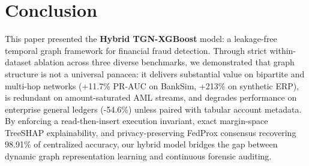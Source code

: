 \section{Conclusion}\label{sec:conclusion}
This paper presented the \textbf{Hybrid TGN-XGBoost} model: a leakage-free temporal graph framework for financial fraud detection. Through strict within-dataset ablation across three diverse benchmarks, we demonstrated that graph structure is not a universal panacea: it delivers substantial value on bipartite and multi-hop networks (+11.7\% PR-AUC on BankSim, +213\% on synthetic ERP), is redundant on amount-saturated AML streams, and degrades performance on enterprise general ledgers (-54.6\%) unless paired with tabular account metadata. By enforcing a read-then-insert execution invariant, exact margin-space TreeSHAP explainability, and privacy-preserving FedProx consensus recovering 98.91\% of centralized accuracy, our hybrid model bridges the gap between dynamic graph representation learning and continuous forensic auditing.
